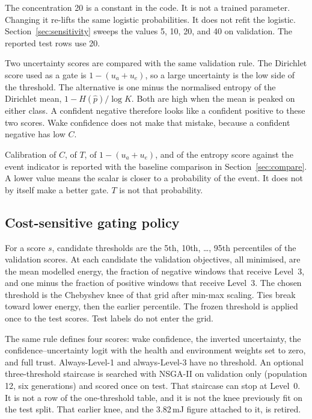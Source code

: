 \documentclass[sn-mathphys-num]{sn-jnl}%
\theoremstyle{thmstyleone}%
\theoremstyle{thmstyletwo}%
\theoremstyle{thmstylethree}%
\begin{document}
The concentration 20 is a constant in the code. It is not a trained parameter. Changing it re-lifts the same logistic probabilities. It does not refit the logistic. Section~\ref{sec:sensitivity} sweeps the values 5, 10, 20, and 40 on validation. The reported test rows use 20.

Two uncertainty scores are compared with the same validation rule. The Dirichlet score used as a gate is $1 - (u_a + u_e)$, so a large uncertainty is the low side of the threshold. The alternative is one minus the normalised entropy of the Dirichlet mean, $1 - H(\hat{p})/\log K$. Both are high when the mean is peaked on either class. A confident negative therefore looks like a confident positive to these two scores. Wake confidence does not make that mistake, because a confident negative has low $C$.

Calibration of $C$, of $T$, of $1-(u_a+u_e)$, and of the entropy score against the event indicator is reported with the baseline comparison in Section~\ref{sec:compare}. A lower value means the scalar is closer to a probability of the event. It does not by itself make a better gate. $T$ is not that probability.

\subsection{Cost-sensitive gating policy}\label{sec:policy}

For a score $s$, candidate thresholds are the 5th, 10th, \ldots, 95th percentiles of the validation scores. At each candidate the validation objectives, all minimised, are the mean modelled energy, the fraction of negative windows that receive Level~3, and one minus the fraction of positive windows that receive Level~3. The chosen threshold is the Chebyshev knee of that grid after min-max scaling. Ties break toward lower energy, then the earlier percentile. The frozen threshold is applied once to the test scores. Test labels do not enter the grid.

The same rule defines four scores: wake confidence, the inverted uncertainty, the confidence--uncertainty logit with the health and environment weights set to zero, and full trust. Always-Level-1 and always-Level-3 have no threshold. An optional three-threshold staircase is searched with NSGA-II \cite{deb2002} on validation only (population 12, six generations) and scored once on test. That staircase can stop at Level~0. It is not a row of the one-threshold table, and it is not the knee previously fit on the test split. That earlier knee, and the 3.82\,mJ figure attached to it, is retired.
\end{document}
